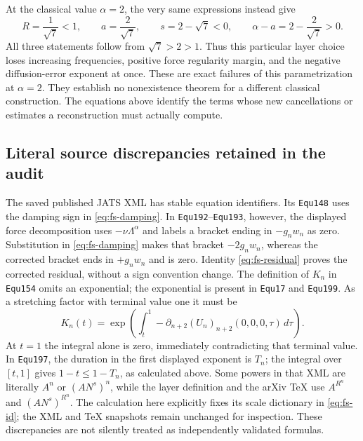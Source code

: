 At the classical value $\alpha=2$, the very same expressions instead give
\[
 R=\frac1{\sqrt7}<1,\qquad
 a=\frac2{\sqrt7},\qquad s=2-\sqrt7<0,
 \qquad \alpha-a=2-\frac2{\sqrt7}>0.            \tag{FS17}
\]
All three statements follow from $\sqrt7>2>1$. Thus this particular layer
choice loses increasing frequencies, positive force regularity margin, and
the negative diffusion-error exponent at once. These are exact failures of
this parametrization at $\alpha=2$. They establish no nonexistence theorem
for a different classical construction. The equations above identify the
terms whose new cancellations or estimates a reconstruction must actually
compute.

\subsection{Literal source discrepancies retained in the audit}

The saved published JATS XML has stable equation identifiers. Its
\texttt{Equ148} uses the damping sign in \eqref{eq:fs-damping}. In
\texttt{Equ192}--\texttt{Equ193}, however, the displayed force decomposition
uses $-\nu\Lambda^\alpha$ and labels a bracket ending in $-g_nw_n$ as zero.
Substitution in \eqref{eq:fs-damping} makes that bracket $-2g_nw_n$, whereas
the corrected bracket ends in $+g_nw_n$ and is zero. Identity
\eqref{eq:fs-residual} proves the corrected residual, without a sign convention
change. The definition of $K_n$ in \texttt{Equ154} omits an exponential;
the exponential is present in \texttt{Equ17} and \texttt{Equ199}. As a
stretching factor with terminal value one it must be
\[
 K_n(t)=\exp\left(\int_t^1
       -\partial_{n+2}(U_n)_{n+2}(0,0,0,\tau)\,d\tau\right).
\]
At $t=1$ the integral alone is zero, immediately contradicting that terminal
value. In \texttt{Equ197}, the duration in the first displayed exponent is
$T_n$; the integral over $[t,1]$ gives $1-t\leq1-T_n$, as calculated above.
Some powers in that XML are literally $A^n$ or $(AN^s)^n$, while the layer
definition and the arXiv TeX use $A^{R^n}$ and $(AN^s)^{R^n}$. The calculation
here explicitly fixes its scale dictionary in \eqref{eq:fs-id}; the XML and
TeX snapshots remain unchanged for inspection. These discrepancies are not
silently treated as independently validated formulas.

